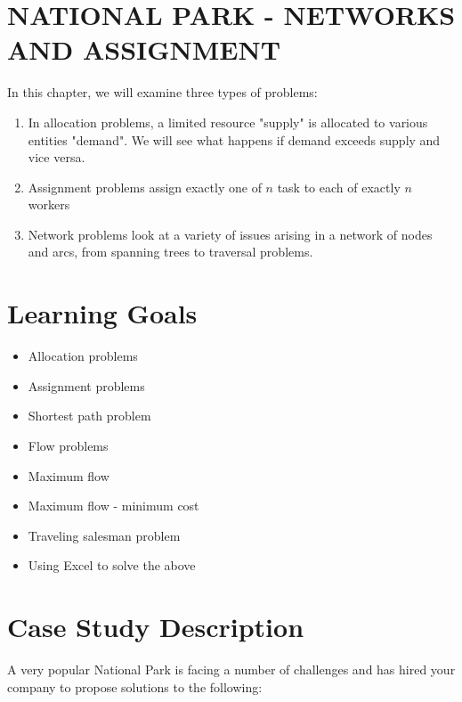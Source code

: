 \documentclass[10pt]{article}
\begin{document}
\section{NATIONAL PARK - NETWORKS AND ASSIGNMENT}
In this chapter, we will examine three types of problems:

\begin{enumerate}
  \item In allocation problems, a limited resource "supply" is allocated to various entities "demand". We will see what happens if demand exceeds supply and vice versa.

  \item Assignment problems assign exactly one of $n$ task to each of exactly $n$ workers

  \item Network problems look at a variety of issues arising in a network of nodes and arcs, from spanning trees to traversal problems.

\end{enumerate}
\section{Learning Goals}
\begin{itemize}
  \item Allocation problems

  \item Assignment problems

  \item Shortest path problem

  \item Flow problems

  \item Maximum flow

  \item Maximum flow - minimum cost

  \item Traveling salesman problem

  \item Using Excel to solve the above

\end{itemize}
\section{Case Study Description}
A very popular National Park is facing a number of challenges and has hired your company to propose solutions to the following:
\end{document}
